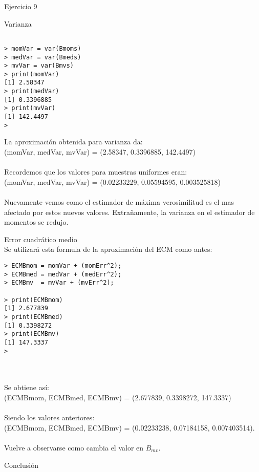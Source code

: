 \begin{section}{Ejercicio 9}
\begin{subsection}{Varianza}
\begin{verbatim}

> momVar = var(Bmoms)
> medVar = var(Bmeds)
> mvVar = var(Bmvs)
> print(momVar)
[1] 2.58347
> print(medVar)
[1] 0.3396885
> print(mvVar)
[1] 142.4497
> 

\end{verbatim}

La aproximación obtenida para varianza da: \\
(momVar, medVar, mvVar) = (2.58347, 0.3396885, 142.4497)\\
~\\
Recordemos que los valores para muestras uniformes eran:\\
(momVar, medVar, mvVar) = (0.02233229, 0.05594595, 0.003525818)\\
~\\
Nuevamente vemos como el estimador de máxima verosimilitud es el mas afectado por estos nuevos valores.
Extrañamente, la varianza en el estimador de momentos se redujo.
\end{subsection}
\begin{subsection}{Error cuadrático medio}~\\

Se utilizará esta formula de la aproximación del ECM como antes:

\begin{verbatim}
> ECMBmom = momVar + (momErr^2);
> ECMBmed = medVar + (medErr^2);
> ECMBmv  = mvVar + (mvErr^2);

> print(ECMBmom)
[1] 2.677839
> print(ECMBmed)
[1] 0.3398272
> print(ECMBmv)
[1] 147.3337
> 
\end{verbatim}
~\\
~\\
Se obtiene así:\\
(ECMBmom, ECMBmed, ECMBmv) = (2.677839, 0.3398272, 147.3337)\\
~\\
Siendo los valores anteriores:\\
 (ECMBmom, ECMBmed, ECMBmv) = (0.02233238, 0.07184158, 0.007403514).\\
 ~\\
Vuelve a observarse como cambia el valor en $B_{mv}$. 


\end{subsection}
\begin{subsection}{Conclusión}~\\


\end{subsection}
\end{section}
